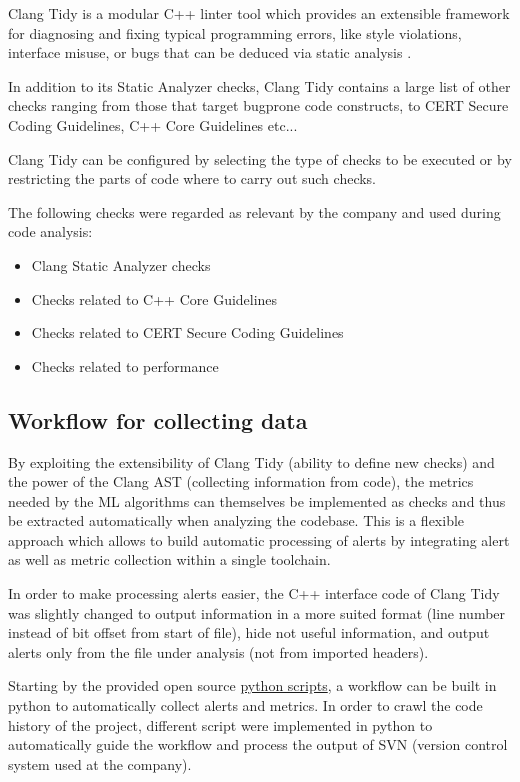 Clang Tidy is a modular C++ linter tool which provides an extensible framework for diagnosing and fixing typical programming errors, like style violations, interface misuse, or bugs that can be deduced via static analysis \cite{clang_tidy}. 

In addition to its Static Analyzer checks, Clang Tidy contains a large list of other checks ranging from those that target bugprone code constructs, to CERT Secure Coding Guidelines, C++ Core Guidelines etc...

Clang Tidy can be configured by selecting the type of checks to be executed or by restricting the parts of code where to carry out such checks.

The following checks were regarded as relevant by the company and used during code analysis:
\begin{itemize}
	\item Clang Static Analyzer checks
	\item Checks related to C++ Core Guidelines
	\item Checks related to CERT Secure Coding Guidelines
	\item Checks related to performance
\end{itemize}

\subsection{Workflow for collecting data \label{data_collection}}

By exploiting the extensibility of Clang Tidy (ability to define new checks) and the power of the Clang AST (collecting information from code), the metrics needed by the ML algorithms can themselves be implemented as checks and thus be extracted automatically when analyzing the codebase. This is a flexible approach which allows to build automatic processing of alerts by integrating alert as well as metric collection within a single toolchain.

In order to make processing alerts easier, the C++ interface code of Clang Tidy was slightly changed to output information in a more suited format (line number instead of bit offset from start of file), hide not useful information, and output alerts only from the file under analysis (not from imported headers).

Starting by the provided open source \href{https://github.com/llvm-mirror/clang-tools-extra/blob/master/clang-tidy/tool/run-clang-tidy.py}{python scripts}, a workflow can be built in python to automatically collect alerts and metrics. In order to crawl the code history of the project, different script were implemented in python to automatically guide the workflow and process the output of SVN (version control system used at the company).

